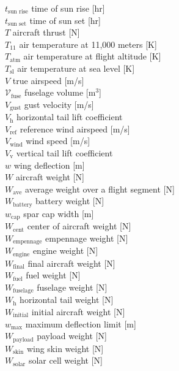 \documentclass[]{aiaa-tc}%
\begin{document}
\begin{multicols}{2}
\begin{tabbing}
$t_{\text{sun rise}}$ \> time of sun rise [hr] \\
$t_{\text{sun set}}$ \> time of sun set [hr] \\
$T$ \> aircraft thrust [N] \\
$T_{11}$ \> air temperature at 11,000 meters [K] \\
$T_{\text{atm}}$ \> air temperature at flight altitude [K] \\
$T_{\text{sl}}$ \> air temperature at sea level [K] \\
$V$ \> true airspeed [m/s] \\
$\mathcal{V}_{\text{fuse}}$ \>  fuselage volume [m$^3$] \\
$V_{\text{gust}}$ \>  gust velocity [m/s] \\
$V_{\text{h}}$ \> horizontal tail lift coefficient \\
$V_{\text{ref}}$ \>  reference wind airspeed [m/s] \\
$V_{\text{wind}}$ \>  wind speed [m/s] \\
$V_{\text{v}}$ \> vertical tail lift coefficient \\
$w$ \> wing deflection [m] \\
$W$ \> aircraft weight [N] \\
$W_{\text{ave}}$ \> average weight over a flight segment [N] \\
$W_{\text{battery}}$ \> battery weight [N] \\
$w_{\text{cap}}$ \> spar cap width [m] \\
$W_{\text{cent}}$ \> center of aircraft weight [N] \\
$W_{\text{empennage}}$ \> empennage weight [N] \\
$W_{\text{engine}}$ \> engine weight [N] \\
$W_{\text{final}}$ \> final aircraft weight [N] \\
$W_{\text{fuel}}$ \> fuel weight [N] \\
$W_{\text{fuselage}}$ \> fuselage weight [N] \\
$W_{\text{h}}$ \> horizontal tail weight [N] \\
$W_{\text{initial}}$ \> initial aircraft weight [N] \\
$w_{\text{max}}$ \> maximum deflection limit [m] \\
$W_{\text{payload}}$ \> payload weight [N] \\
$W_{\text{skin}}$ \> wing skin weight [N] \\
$W_{\text{solar}}$ \> solar cell weight [N] \\

\end{tabbing}
\end{multicols}
\end{document}
